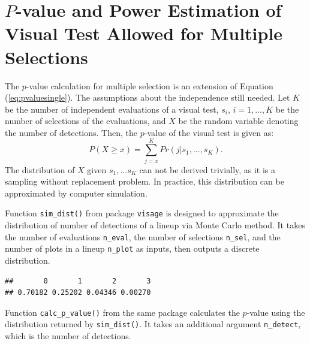 \documentclass{monashthesis}
\theoremstyle{definition}
\theoremstyle{definition}
\theoremstyle{definition}
\theoremstyle{definition}
\theoremstyle{remark}
\begin{document}
\hypertarget{p-value-and-power-estimation-of-visual-test-allowed-for-multiple-selections}{%
\section{\texorpdfstring{\(P\)-value and Power Estimation of Visual Test Allowed for Multiple Selections}{P-value and Power Estimation of Visual Test Allowed for Multiple Selections}}\label{p-value-and-power-estimation-of-visual-test-allowed-for-multiple-selections}}

The \(p\)-value calculation for multiple selection is an extension of Equation (\ref{eq:pvaluesingle}). The assumptions about the independence still needed. Let \(K\) be the number of independent evaluations of a visual test, \(s_i\), \(i = 1,...,K\) be the number of selections of the evaluations, and \(X\) be the random variable denoting the number of detections. Then, the \(p\)-value of the visual test is given as:
\begin{equation} \label{eq:pvaluemulti}
P(X\geq x) = \sum_{j=x}^{K}Pr(j|s_1,...,s_K).
\end{equation}
The distribution of \(X\) given \(s_1,...s_K\) can not be derived trivially, as it is a sampling without replacement problem. In practice, this distribution can be approximated by computer simulation.

Function \texttt{sim\_dist()} from package \texttt{visage} is designed to approximate the distribution of number of detections of a lineup via Monte Carlo method. It takes the number of evaluations \texttt{n\_eval}, the number of selections \texttt{n\_sel}, and the number of plots in a lineup \texttt{n\_plot} as inputs, then outputs a discrete distribution.

\begin{Shaded}
\begin{Highlighting}[]
\NormalTok{(} \NormalTok{, } \NormalTok{(}\NormalTok{, }\NormalTok{, }\NormalTok{), } \NormalTok{)}
\end{Highlighting}
\end{Shaded}

\begin{verbatim}
##       0       1       2       3 
## 0.70182 0.25202 0.04346 0.00270
\end{verbatim}

Function \texttt{calc\_p\_value()} from the same package calculates the \(p\)-value using the distribution returned by \texttt{sim\_dist()}. It takes an additional argument \texttt{n\_detect}, which is the number of detections.
\end{document}
